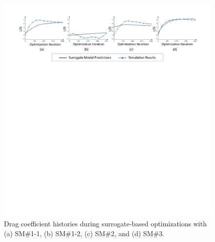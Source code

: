 \begin{figure}[!h]
    \begin{center}
        \includegraphics[width=1\linewidth]{chapter6/fig/SBO_optim_history.pdf}
    \end{center}
    \caption{
        \small Drag coefficient histories during surrogate-based optimizations with (a) SM\#1-1, (b) SM\#1-2, (c) SM\#2, and (d) SM\#3.
    }
    \label{ch6:fig:main_SBO_optimized_history}
\end{figure}

